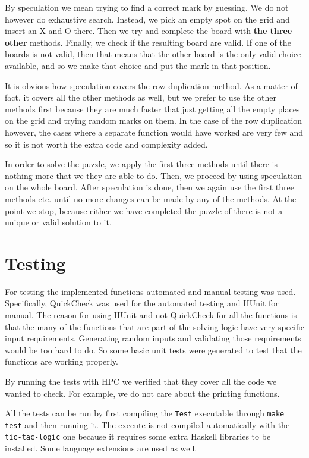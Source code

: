 \documentclass[11pt, a4paper]{scrartcl}
\newcommand{\cname}[1]{\mbox{\texttt{#1}}}
\begin{document}
By speculation we mean trying to find a correct mark by guessing. We do not
however do exhaustive search. Instead, we pick an empty spot on the grid and
insert an X and O there. Then we try and complete the board with \textbf{the
three other} methods. Finally, we check if the resulting board are valid. If one
of the boards is not valid, then that means that the other board is the only
valid choice available, and so we make that choice and put the mark in that
position.

It is obvious how speculation covers the row duplication method. As a matter of
fact, it covers all the other methods as well, but we prefer to use the other
methods first because they are much faster that just getting all the empty
places on the grid and trying random marks on them. In the case of the row
duplication however, the cases where a separate function would have worked are
very few and so it is not worth the extra code and complexity added.

In order to solve the puzzle, we apply the first three methods until there is
nothing more that we they are able to do. Then, we proceed by using speculation
on the whole board. After speculation is done, then we again use the first three
methods etc. until no more changes can be made by any of the methods. At the
point we stop, because either we have completed the puzzle of there is not a
unique or valid solution to it.

\section{Testing}

For testing the implemented functions automated and manual testing was used.
Specifically, QuickCheck was used for the automated testing and HUnit for
manual. The reason for using HUnit and not QuickCheck for all the functions is
that the many of the functions that are part of the solving logic have very
specific input requirements. Generating random inputs and validating those
requirements would be too hard to do. So some basic unit tests were generated to
test that the functions are working properly.

By running the tests with HPC we verified that they cover all the code we wanted
to check. For example, we do not care about the printing functions.

All the tests can be run by first compiling the \cname{Test} executable through
\cname{make test} and then running it. The execute is not compiled automatically
with the \cname{tic-tac-logic} one because it requires some extra Haskell
libraries to be installed. Some language extensions are used as well.
\end{document}
